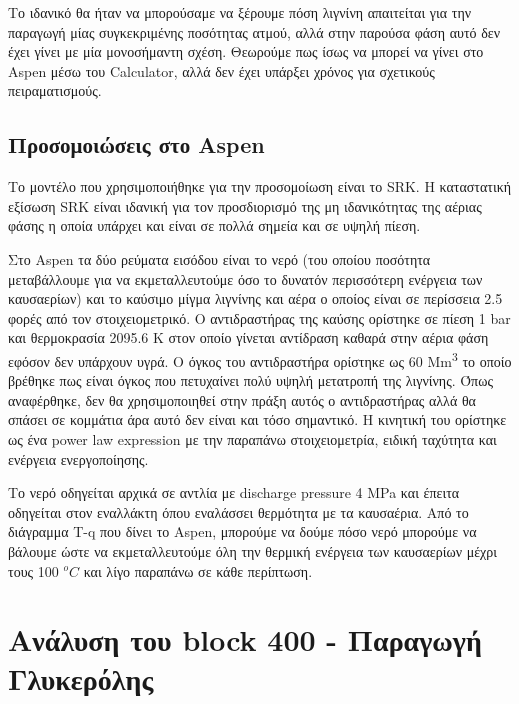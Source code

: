 \documentclass[11pt]{article}
\begin{document}
Το ιδανικό θα ήταν να μπορούσαμε να ξέρουμε πόση λιγνίνη απαιτείται για την παραγωγή μίας συγκεκριμένης ποσότητας ατμού, αλλά στην παρούσα φάση αυτό δεν έχει γίνει με μία μονοσήμαντη σχέση. Θεωρούμε πως ίσως να μπορεί να γίνει στο Aspen μέσω του Calculator, αλλά δεν έχει υπάρξει χρόνος για σχετικούς πειραματισμούς.

\subsection{Προσομοιώσεις στο Aspen}
\label{sec:org9e00360}
Το μοντέλο που χρησιμοποιήθηκε για την προσομοίωση είναι το SRK. Η καταστατική εξίσωση SRK είναι ιδανική για τον προσδιορισμό της μη ιδανικότητας της αέριας φάσης η οποία υπάρχει και είναι σε πολλά σημεία και σε υψηλή πίεση.

Στο Aspen τα δύο ρεύματα εισόδου είναι το νερό (του οποίου ποσότητα μεταβάλλουμε για να εκμεταλλευτούμε όσο το δυνατόν περισσότερη ενέργεια των καυσαερίων) και το καύσιμο μίγμα λιγνίνης και αέρα ο οποίος είναι σε περίσσεια 2.5 φορές από τον στοιχειομετρικό. Ο αντιδραστήρας της καύσης ορίστηκε σε πίεση 1 bar και θερμοκρασία 2095.6 Κ στον οποίο γίνεται αντίδραση καθαρά στην αέρια φάση εφόσον δεν υπάρχουν υγρά. Ο όγκος του αντιδραστήρα ορίστηκε ως 60 Mm\textsuperscript{3} το οποίο βρέθηκε πως είναι όγκος που πετυχαίνει πολύ υψηλή μετατροπή της λιγνίνης. Όπως αναφέρθηκε, δεν θα χρησιμοποιηθεί στην πράξη αυτός ο αντιδραστήρας αλλά θα σπάσει σε κομμάτια άρα αυτό δεν είναι και τόσο σημαντικό. Η κινητική του ορίστηκε ως ένα power law expression με την παραπάνω στοιχειομετρία, ειδική ταχύτητα και ενέργεια ενεργοποίησης.

Το νερό οδηγείται αρχικά σε αντλία με discharge pressure 4 MPa και έπειτα οδηγείται στον εναλλάκτη όπου εναλάσσει θερμότητα με τα καυσαέρια. Από το διάγραμμα T-q που δίνει το Aspen, μπορούμε να δούμε πόσο νερό μπορούμε να βάλουμε ώστε να εκμεταλλευτούμε όλη την θερμική ενέργεια των καυσαερίων μέχρι τους 100 \(^oC\) και λίγο παραπάνω σε κάθε περίπτωση.

\section{Ανάλυση του block 400 - Παραγωγή Γλυκερόλης}
\label{sec:org3d7f7f5}
\end{document}
